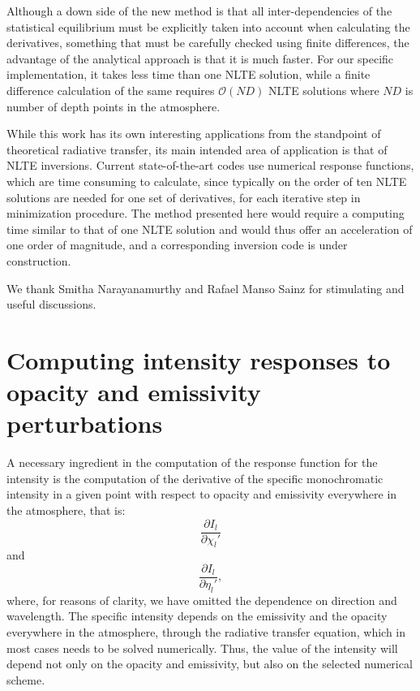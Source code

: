\documentclass{aa}
\begin{document}
Although a down side of the new method is that all inter-dependencies of the statistical equilibrium must be explicitly taken into account when calculating the derivatives, something that must be carefully checked using finite differences, the advantage of the analytical approach is that it is much faster. For our specific implementation, it takes less time than one NLTE solution, while a finite difference calculation of the same requires ${\mathcal O}(ND)$ NLTE solutions where $ND$ is number of depth points in the atmosphere. 

While this work has its own interesting applications from the standpoint of theoretical radiative transfer, its main intended area of application is that of NLTE inversions. Current state-of-the-art codes use numerical response functions, which are time consuming to calculate, since typically on the order of ten NLTE solutions are needed for one set of derivatives, for each iterative step in minimization procedure. The method presented here would require a computing time similar to that of one NLTE solution and would thus offer an acceleration of one order of magnitude, and a corresponding inversion code is under construction.


\begin{acknowledgements}
 We thank Smitha Narayanamurthy and Rafael Manso Sainz for stimulating and useful discussions. 
\end{acknowledgements}

\appendix
\section{Computing intensity responses to opacity and emissivity perturbations}
\label{Appendix_A}

A necessary ingredient in the computation of the response function for the intensity is the computation of the derivative of the specific monochromatic intensity in a given point with respect to opacity and emissivity everywhere in the atmosphere, that is:
$$\frac{\partial I_l}{\partial \chi_l'}$$ 
and 
$$\frac{\partial I_l}{\partial \eta_l'},$$ 
where, for reasons of clarity, we have omitted the dependence on direction and wavelength. The specific intensity depends on the emissivity and the opacity everywhere in the atmosphere, through the radiative transfer equation, which in most cases needs to be solved numerically. Thus, the value of the intensity will depend not only on the opacity and emissivity, but also on the selected numerical scheme. 
\end{document}

